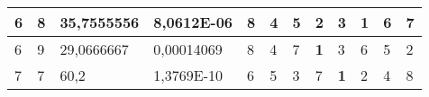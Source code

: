 \documentclass[conference]{IEEEtran}
\begin{document}
\begin{table*}[]
\begin{tabular}{|llll|llllllll|}
\multicolumn{1}{|l|}{6}                                                     & \multicolumn{1}{l|}{8}                                                        & \multicolumn{1}{l|}{35,7555556}                                                   & 8,0612E-06                     & \multicolumn{1}{l|}{8}                                                  & \multicolumn{1}{l|}{4}                                                  & \multicolumn{1}{l|}{5}                                                  & \multicolumn{1}{l|}{2}                                                  & \multicolumn{1}{l|}{3}                                                  & \multicolumn{1}{l|}{\textbf{1}}                                         & \multicolumn{1}{l|}{6}                                                  & 7                          \\ \hline
\multicolumn{1}{|l|}{6}                                                     & \multicolumn{1}{l|}{9}                                                        & \multicolumn{1}{l|}{29,0666667}                                                   & 0,00014069                     & \multicolumn{1}{l|}{8}                                                  & \multicolumn{1}{l|}{4}                                                  & \multicolumn{1}{l|}{7}                                                  & \multicolumn{1}{l|}{\textbf{1}}                                         & \multicolumn{1}{l|}{3}                                                  & \multicolumn{1}{l|}{6}                                                  & \multicolumn{1}{l|}{5}                                                  & 2                          \\ \hline
\multicolumn{1}{|l|}{7}                                                     & \multicolumn{1}{l|}{7}                                                        & \multicolumn{1}{l|}{60,2}                                                         & 1,3769E-10                     & \multicolumn{1}{l|}{6}                                                  & \multicolumn{1}{l|}{5}                                                  & \multicolumn{1}{l|}{3}                                                  & \multicolumn{1}{l|}{7}                                                  & \multicolumn{1}{l|}{\textbf{1}}                                         & \multicolumn{1}{l|}{2}                                                  & \multicolumn{1}{l|}{4}                                                  & 8                          \\ \hline

\end{tabular}
\end{table*}
\end{document}
